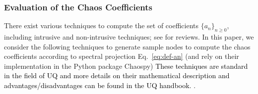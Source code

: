 \documentclass[preprint,review,12pt]{elsarticle}
\newcommand{\rev}[1]{\textcolor{black}{#1}}
\begin{document}
\subsubsection{Evaluation of the Chaos Coefficients}
\label{subsubsec:spectral projection}
There exist various techniques to compute the set of coefficients $\{a_n\}_{n \geq 0}$, including intrusive and non-intrusive techniques; see \citep{le2010spectral,ghanem2017handbook} for reviews. 
In this paper, we consider the following techniques to generate sample nodes to compute the chaos coefficients according to spectral projection Eq.~\eqref{eq:def-an} (and rely on their implementation in the Python package Chaospy) \rev{These techniques are standard in the field of UQ and more details on their mathematical description and advantages/disadvantages can be found in the UQ handbook. \cite{ghanem2017handbook}}.
\end{document}
